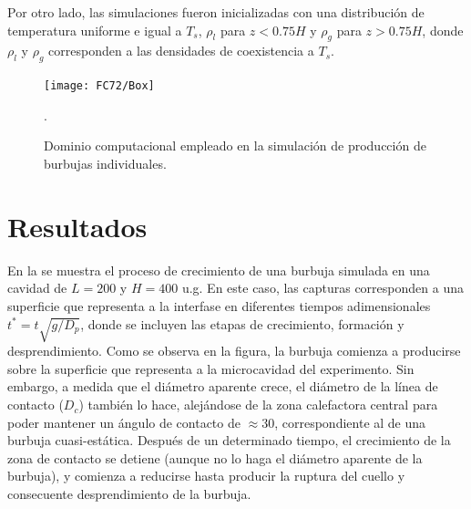 Por otro lado, las simulaciones fueron inicializadas con una distribuci\'on de temperatura uniforme e igual a $T_s$, $\rho_l$ para $z<0.75H$ y $\rho_g$ para $z>0.75H$, donde $\rho_l$ y $\rho_g$ corresponden a las densidades de coexistencia a $T_s$.

\begin{figure}[ht]
	\centering
	\texttt{[image: FC72/Box]}
	\caption{Dominio computacional empleado en la simulaci\'on de producci\'on de burbujas individuales.}.
	\label{fig:dominio_hutter}
\end{figure}






\section{Resultados}



En la  se muestra el proceso de crecimiento de una burbuja  simulada en una cavidad de $L=200$ y $H=400$ u.g. En este caso, las capturas corresponden a una superficie que representa a la interfase en diferentes tiempos adimensionales $t^*=t\sqrt{g/D_p}$, donde se incluyen las etapas de crecimiento, formaci\'on y desprendimiento. Como se observa en la figura, la burbuja comienza a producirse sobre la superficie que representa a la microcavidad del experimento. Sin embargo, a medida que el di\'ametro aparente crece, el di\'ametro de la l\'inea de contacto ($D_c$) tambi\'en lo hace, alej\'andose de la zona calefactora central para poder mantener un \'angulo de contacto de $\approx 30$\textordmasculine, correspondiente al de una burbuja cuasi-est\'atica. Despu\'es de un determinado tiempo, el crecimiento de la zona de contacto se detiene (aunque no lo haga el di\'ametro aparente de la burbuja), y comienza a reducirse hasta producir la ruptura del cuello y consecuente desprendimiento de la burbuja. 

